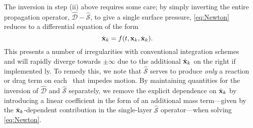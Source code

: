 The inversion in step (ii) above requires some care; by simply inverting the entire propagation operator, $\hat{\mathcal{D}} - \hat{\mathcal{S}}$, to give a single surface pressure, \cref{eq:Newton} reduces to a differential equation of the form
\begin{equation}
  \label{eq:malformed}
  \dot{\vb{x}}_k = f(t, \vb{x}_k, \dot{\vb{x}}_k).
\end{equation}
This presents a number of irregularities with conventional integration schemes and will rapidly diverge towards $\pm \infty$ due to the additional $\dot{\vb{x}}_k$ on the right if implemented \naive ly.
To remedy this, we note that $\hat{\mathcal{S}}$ serves to produce \emph{only} a reaction or drag term on each \bubble\ that impedes motion.
By maintaining quantities for the inversion of $\hat{\mathcal{D}}$ and $\hat{\mathcal{S}}$ separately, we remove the explicit dependence on $\dot{\vb{x}}_k$ by introducing a linear coefficient in the form of an additional mass term---given by the $\dot{\vb{x}}_k$-dependent contribution in the single-layer $\hat{\mathcal{S}}$ operator---when solving \cref{eq:Newton}. 

